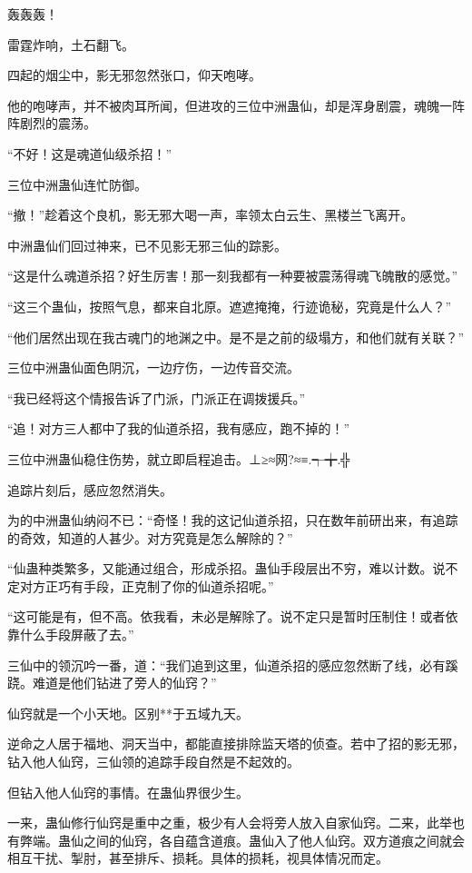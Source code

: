
\begin{this_body}

轰轰轰！

雷霆炸响，土石翻飞。

四起的烟尘中，影无邪忽然张口，仰天咆哮。

他的咆哮声，并不被肉耳所闻，但进攻的三位中洲蛊仙，却是浑身剧震，魂魄一阵阵剧烈的震荡。

“不好！这是魂道仙级杀招！”

三位中洲蛊仙连忙防御。

“撤！”趁着这个良机，影无邪大喝一声，率领太白云生、黑楼兰飞离开。

中洲蛊仙们回过神来，已不见影无邪三仙的踪影。

“这是什么魂道杀招？好生厉害！那一刻我都有一种要被震荡得魂飞魄散的感觉。”

“这三个蛊仙，按照气息，都来自北原。遮遮掩掩，行迹诡秘，究竟是什么人？”

“他们居然出现在我古魂门的地渊之中。是不是之前的级塌方，和他们就有关联？”

三位中洲蛊仙面色阴沉，一边疗伤，一边传音交流。

“我已经将这个情报告诉了门派，门派正在调拨援兵。”

“追！对方三人都中了我的仙道杀招，我有感应，跑不掉的！”

三位中洲蛊仙稳住伤势，就立即启程追击。⊥≥≈网?≈≡.┭╈.╬

追踪片刻后，感应忽然消失。

为的中洲蛊仙纳闷不已：“奇怪！我的这记仙道杀招，只在数年前研出来，有追踪的奇效，知道的人甚少。对方究竟是怎么解除的？”

“仙蛊种类繁多，又能通过组合，形成杀招。蛊仙手段层出不穷，难以计数。说不定对方正巧有手段，正克制了你的仙道杀招呢。”

“这可能是有，但不高。依我看，未必是解除了。说不定只是暂时压制住！或者依靠什么手段屏蔽了去。”

三仙中的领沉吟一番，道：“我们追到这里，仙道杀招的感应忽然断了线，必有蹊跷。难道是他们钻进了旁人的仙窍？”

仙窍就是一个小天地。区别**于五域九天。

逆命之人居于福地、洞天当中，都能直接排除监天塔的侦查。若中了招的影无邪，钻入他人仙窍，三仙领的追踪手段自然是不起效的。

但钻入他人仙窍的事情。在蛊仙界很少生。

一来，蛊仙修行仙窍是重中之重，极少有人会将旁人放入自家仙窍。二来，此举也有弊端。蛊仙之间的仙窍，各自蕴含道痕。蛊仙入了他人仙窍。双方道痕之间就会相互干扰、掣肘，甚至排斥、损耗。具体的损耗，视具体情况而定。


\end{this_body}
